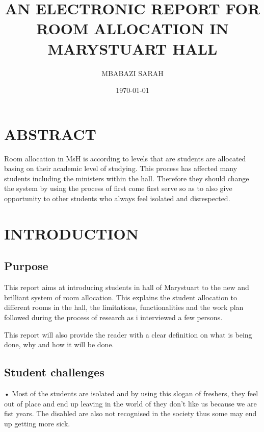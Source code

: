 \documentclass[14pt]{article}
\begin{document}
\title{AN ELECTRONIC REPORT FOR ROOM ALLOCATION IN MARYSTUART HALL}

\author{MBABAZI SARAH }

\date {\today}

\maketitle

\tableofcontents


\section{ABSTRACT}

Room allocation in MsH is according to levels that are students are allocated basing on their academic level of studying. This process has affected many students including the ministers within the hall. Therefore they should change the system by using the process of first come first serve so as to also give opportunity to other students who always feel isolated and disrespected.\par


\section{INTRODUCTION}

\subsection{Purpose}
This report aims at introducing students in hall of Marystuart to the new and brilliant system of room allocation. This explains the student allocation to different rooms in the hall, the limitations, functionalities and the work plan followed during the process of research as i interviewed a few persons.\par 

This report will also provide the reader with a clear definition on what is being done, why and how it will be done.\par
 

\subsection{Student challenges}
•	Most of the students are isolated and by using this slogan of freshers, they feel out of place and end up leaving in the world of they don’t like us because we are fist years. The disabled are also not recognised in the society thus some may end up getting more sick.\par
\end{document}
